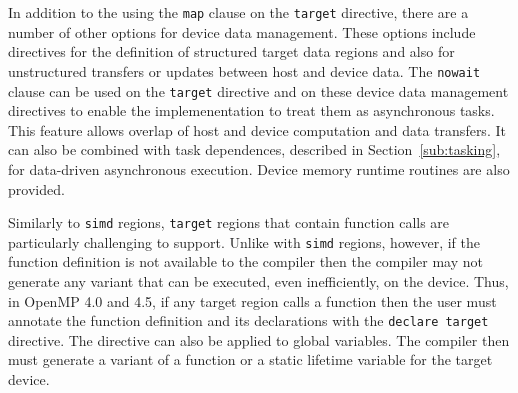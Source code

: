 In addition to the using the \texttt{map} clause on the \texttt{target}
directive, there are a number of other options for device data management. 
These options include directives for the definition of structured target data 
regions and also for unstructured transfers or updates between host and 
device data. The \texttt{nowait} clause can be used on the \texttt{target}
directive and on these device data management directives to enable the 
implemenentation to treat them as asynchronous tasks.  This feature allows 
overlap of host and device computation and data transfers.  It can also be 
combined with task dependences, described in Section~\ref{sub:tasking},  
for data-driven asynchronous execution. Device memory runtime routines are 
also provided.

Similarly to \texttt{simd} regions, \texttt{target} regions that contain 
function calls are particularly challenging to support.  Unlike with 
\texttt{simd} regions, however, if the function definition is not 
available to the compiler then the compiler may not generate any variant
that can be executed, even inefficiently, on the device. Thus, in OpenMP 4.0
and 4.5, if any target region calls a function then the user must annotate  
the function definition and its declarations with the \texttt{declare target} 
directive. The directive can also be applied to global variables. The compiler
then must generate a variant of a function or a static lifetime variable for 
the target device. 

